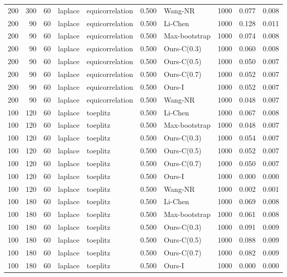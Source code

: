 \begin{tabular}{rrrllrlrrr}
200 & 300 & 60 & laplace & equicorrelation & 0.500 & Wang-NR & 1000 & 0.077 & 0.008 \\
200 & 90 & 60 & laplace & equicorrelation & 0.500 & Li-Chen & 1000 & 0.128 & 0.011 \\
200 & 90 & 60 & laplace & equicorrelation & 0.500 & Max-bootstrap & 1000 & 0.074 & 0.008 \\
200 & 90 & 60 & laplace & equicorrelation & 0.500 & Ours-C(0.3) & 1000 & 0.060 & 0.008 \\
200 & 90 & 60 & laplace & equicorrelation & 0.500 & Ours-C(0.5) & 1000 & 0.050 & 0.007 \\
200 & 90 & 60 & laplace & equicorrelation & 0.500 & Ours-C(0.7) & 1000 & 0.052 & 0.007 \\
200 & 90 & 60 & laplace & equicorrelation & 0.500 & Ours-I & 1000 & 0.052 & 0.007 \\
200 & 90 & 60 & laplace & equicorrelation & 0.500 & Wang-NR & 1000 & 0.048 & 0.007 \\
100 & 120 & 60 & laplace & toeplitz & 0.500 & Li-Chen & 1000 & 0.067 & 0.008 \\
100 & 120 & 60 & laplace & toeplitz & 0.500 & Max-bootstrap & 1000 & 0.048 & 0.007 \\
100 & 120 & 60 & laplace & toeplitz & 0.500 & Ours-C(0.3) & 1000 & 0.054 & 0.007 \\
100 & 120 & 60 & laplace & toeplitz & 0.500 & Ours-C(0.5) & 1000 & 0.052 & 0.007 \\
100 & 120 & 60 & laplace & toeplitz & 0.500 & Ours-C(0.7) & 1000 & 0.050 & 0.007 \\
100 & 120 & 60 & laplace & toeplitz & 0.500 & Ours-I & 1000 & 0.000 & 0.000 \\
100 & 120 & 60 & laplace & toeplitz & 0.500 & Wang-NR & 1000 & 0.002 & 0.001 \\
100 & 180 & 60 & laplace & toeplitz & 0.500 & Li-Chen & 1000 & 0.069 & 0.008 \\
100 & 180 & 60 & laplace & toeplitz & 0.500 & Max-bootstrap & 1000 & 0.061 & 0.008 \\
100 & 180 & 60 & laplace & toeplitz & 0.500 & Ours-C(0.3) & 1000 & 0.091 & 0.009 \\
100 & 180 & 60 & laplace & toeplitz & 0.500 & Ours-C(0.5) & 1000 & 0.088 & 0.009 \\
100 & 180 & 60 & laplace & toeplitz & 0.500 & Ours-C(0.7) & 1000 & 0.082 & 0.009 \\
100 & 180 & 60 & laplace & toeplitz & 0.500 & Ours-I & 1000 & 0.000 & 0.000 \\

\end{tabular}
